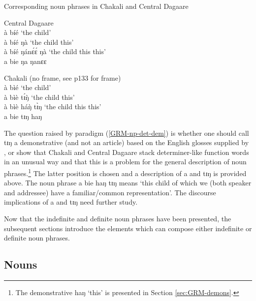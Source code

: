 \begin{exe}
\begin{exe}
\begin{exe}
{\begin{exe}
\begin{exe}
\begin{exe}
\begin{exe}
\ea\label{GRM-np-det-dem}{\rm Corresponding  noun phrases in Chakali and
Central  Dagaare} 

\begin{multicols}{2}

 \ea\label{GRM-np-det-dem-dag}{\rm Central Dagaare}\\
à bíé   `the child'\\
à bíé ŋà   `the child this'\\
à bíé  ŋánɛ́ɛ́ ŋà  `the child this this'\\
 \textasteriskcentered  a bie  ŋa ŋanɛɛ  

 \ex\label{GRM-np-det-dem-cli}{\rm Chakali}  (no frame, see p133 for frame)\\
à bìé   `the child'\\
à bìè tɪ́ŋ̀   `the child this'\\
à bìè háŋ̀ tɪ̀ŋ  `the child this this'\\
 \textasteriskcentered a bie  tɪŋ haŋ  

 
\z
\end{multicols}
 \z




The question raised by paradigm  (\ref{GRM-np-det-dem}) is  whether one
should call {\sls tɪŋ} a demonstrative (and not an article) based  on the 
English
glosses  supplied by  \citet[47]{Bodo97}, or show that Chakali and Central
Dagaare stack determiner-like function words in an unusual way and that this is
a problem for the general description of noun phrases.\footnote{The
demonstrative {\sls haŋ} `this' is presented in Section \ref {sec:GRM-demons}.}
The latter position is
chosen and a description of  {\sls a} and {\sls tɪŋ} is provided above. The
noun phrase {\sls a bie haŋ tɪŋ} means `this child of which we (both speaker and
addressee)   have a familiar/common representation'.  The discourse implications
 of  {\sls a} and  {\sls tɪŋ}  need 
further study. 

Now that the indefinite and definite noun phrases have been presented, the
subsequent sections introduce the elements which can compose  either  indefinite
or  definite noun  phrases.




\subsection{Nouns}
\label{sec:GRM-noun}


\end{exe}
\end{exe}
\end{exe}
\end{exe}}
\end{exe}
\end{exe}
\end{exe}
